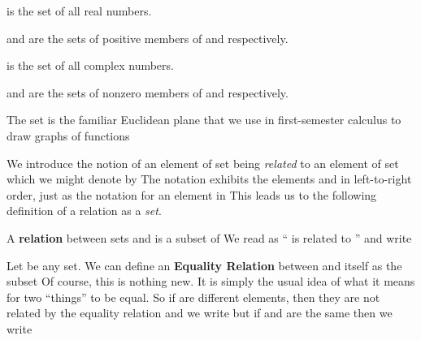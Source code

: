 \documentclass[11pt,oneside]{article}
\begin{document}
\begin{BookBody}

 is the set of all real numbers.

 and  are the sets of positive members of  and  respectively.

 is the set of all complex numbers.

 and  are the sets of nonzero members of  and  respectively.

 The set  is the familiar Euclidean plane that we use in first-semester calculus to draw graphs of functions\BookEnd{\blacktriangle}


\noindent We introduce the notion of an element  of set  being\textit{ related} to an element  of set  which we might denote by  The notation  exhibits the elements  and  in left-to-right order, just as the notation  for an element in  This leads us to the following definition of a relation  as a\textit{ set}.

 A\textbf{ relation} between sets  and  is a subset  of  We read  as “ is related to ” and write \BookEnd{\blacksquare}

 Let  be any set. We can define an\textbf{ Equality Relation} \BookInline{= } between  and itself as the subset  Of course, this is nothing new. It is simply the usual idea of what it means for two “things” to be equal. So if  are different elements, then they are not related by the equality relation and we write  but if  and  are the same then we write \BookEnd{\blacktriangle}


\end{BookBody}
\end{document}
